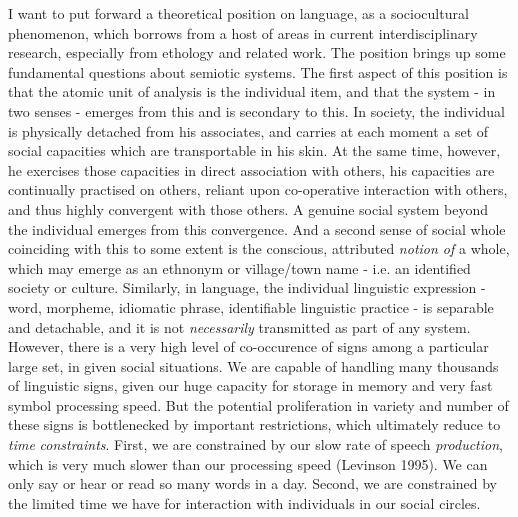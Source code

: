I want to put forward a theoretical position on language, as a sociocultural phenomenon, which borrows from a host of areas in current interdisciplinary research, especially from ethology and related work. The position brings up some fundamental questions about semiotic systems. The first aspect of this position is that the atomic unit of analysis is the individual item, and that the system - in two senses - emerges from this and is secondary to this. In society, the individual is physically detached from his associates, and carries at each moment a set of social capacities which are transportable in his skin. At the same time, however, he exercises those capacities in direct association with others, his capacities are continually practised on others, reliant upon co-operative interaction with others, and thus highly convergent with those others. A genuine social system beyond the individual emerges from this convergence. And a second sense of social whole coinciding with this to some extent is the conscious, attributed \textit{notion of} a whole, which may emerge as an ethnonym or village/town name - i.e. an identified society or culture. Similarly, in language, the individual linguistic expression - word, morpheme, idiomatic phrase, identifiable linguistic practice - is separable and detachable, and it is not \textit{necessarily} transmitted as part of any system. However, there is a very high level of co-occurence of signs among a particular large set, in given social situations. We are capable of handling many thousands of linguistic signs, given our huge capacity for storage in memory and very fast symbol processing speed. But the potential proliferation in variety and number of these signs is bottlenecked by important restrictions, which ultimately reduce to \textit{time} \textit{constraints}. First, we are constrained by our slow rate of speech \textit{production}, which is very much slower than our processing speed (Levinson 1995). We can only say or hear or read so many words in a day. Second, we are constrained by the limited time we have for interaction with individuals in our social circles. 

